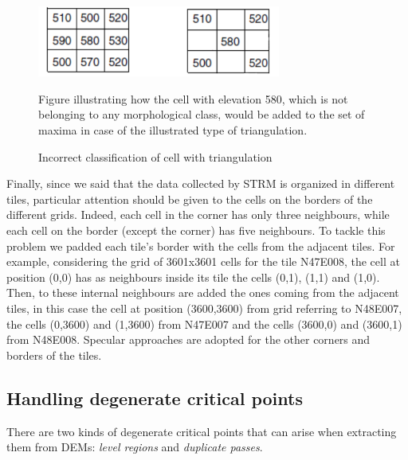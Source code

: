 \begin{figure} 
\centering
\includegraphics[width=8cm]{pictures/spurious_saddle.png}
\caption{Incorrect classification of cell with triangulation}
Figure illustrating how the cell with elevation 580, which is not belonging to any morphological class, would be added to the set of maxima in case of the illustrated type of triangulation.
\label{fig:wrong_peak}
\end{figure}

Finally, since we said that the data collected by STRM is organized in different tiles, particular attention should be given to the cells on the borders of the different grids. Indeed, each cell in the corner has only three neighbours, while each cell on the border (except the corner) has five neighbours. To tackle this problem we padded each tile's border with the cells from the adjacent tiles. For example, considering the grid of 3601x3601 cells for the tile N47E008, the cell at position (0,0) has as neighbours inside its tile the cells (0,1), (1,1) and (1,0). Then, to these internal neighbours are added the ones coming from the adjacent tiles, in this case the cell at position (3600,3600) from grid referring to N48E007, the cells (0,3600) and (1,3600) from N47E007 and the cells (3600,0) and (3600,1) from N48E008. Specular approaches are adopted for the other corners and borders of the tiles.


\subsection{Handling degenerate critical points}
There are two kinds of degenerate critical points that can arise when extracting them from DEMs: \textit{level regions} and \textit{duplicate passes}.

